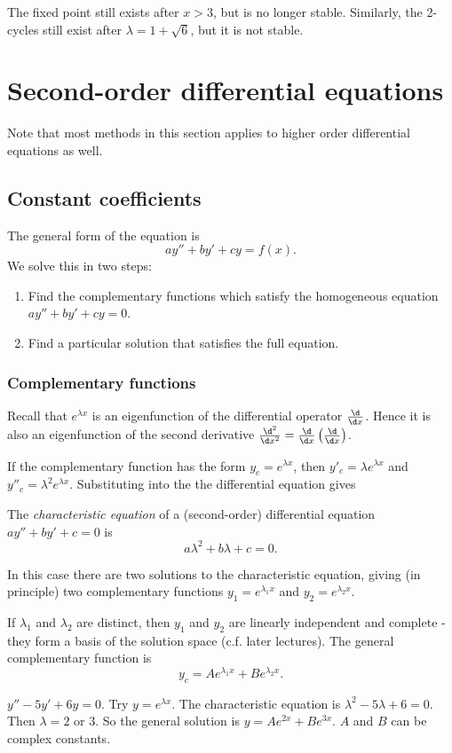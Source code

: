 \documentclass[a4paper]{article}
\begin{document}
\note The fixed point still exists after $x > 3$, but is no longer stable. Similarly, the 2-cycles still exist after $\lambda = 1 + \sqrt{6}$, but it is not stable.

\section{Second-order differential equations}
Note that most methods in this section applies to higher order differential equations as well.
\subsection{Constant coefficients}
The general form of the equation is 
\[
ay'' + by' + cy = f(x).
\]
We solve this in two steps:
\begin{enumerate}
\item Find the complementary functions which satisfy the homogeneous equation $ay'' + by' + cy = 0$.
\item Find a particular solution that satisfies the full equation.
\end{enumerate}
\subsubsection{Complementary functions}
Recall that $e^{\lambda x}$ is an eigenfunction of the differential operator $\frac{\d}{\d x}$. Hence it is also an eigenfunction of the second derivative $\frac{\d^2}{\d x^2} = \frac{\d}{\d x}\left(\frac{\d }{\d x}\right)$.

If the complementary function has the form $y_c = e^{\lambda x}$, then $y'_c = \lambda e^{\lambda x}$ and $y''_c = \lambda^2 e^{\lambda x}$. Substituting into the the differential equation gives
\begin{defi}
  The \emph{characteristic equation} of a (second-order) differential equation $ay'' + by' + c = 0$ is
\[
a\lambda^2 + b\lambda + c = 0.
\]
\end{defi}

 In this case there are two solutions to the characteristic equation, giving (in principle) two complementary functions $y_1 = e^{\lambda_1 x}$ and $y_2 = e^{\lambda_2 x}$.

If $\lambda_1$ and $\lambda_2$ are distinct, then $y_1$ and $y_2$ are linearly independent and complete - they form a basis of the solution space (c.f. later lectures). The general complementary function is
\[
y_c = Ae^{\lambda_1 x} + Be^{\lambda_2 x}.
\]
\begin{eg}
  $y'' - 5y' + 6y = 0$. Try $y = e^{\lambda x}$. The characteristic equation is $\lambda^2 - 5\lambda + 6 = 0$. Then $\lambda = 2$ or $3$. So the general solution is $y = Ae^{2x} + Be^{3x}$.
\note $A$ and $B$ can be complex constants.
\end{eg}
\end{document}
